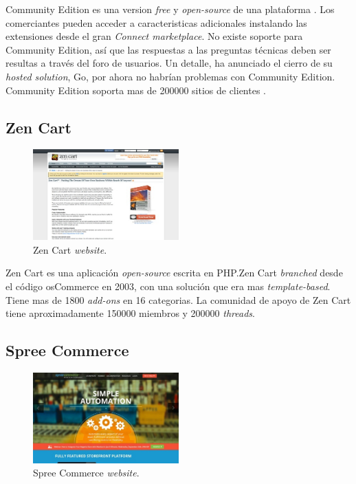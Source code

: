 \nameMagento Community Edition es una version \textit{free} y \textit{open-source} de  una plataforma \ecommerce. Los comerciantes pueden acceder a caracteristicas adicionales instalando las extensiones desde el gran \textit{\nameMagento Connect marketplace}. No existe soporte para \nameMagento Community Edition, así que las respuestas a las preguntas técnicas deben ser resultas a través del foro de usuarios. Un detalle, \nameMagento ha anunciado el cierro de su \textit{hosted solution}, \nameMagento Go, por ahora no habrían problemas con Community Edition. \nameMagento Community Edition soporta mas de 200000 sitios de clientes .

\newcommand{\nameZenCart}{Zen Cart }
\subsection{\nameZenCart}

\begin{figure}[h!]
	\centering
	\includegraphics[width=0.5\textwidth]{figuras/cap1/ZenCartWebsite.jpg}
	\caption{\nameZenCart \textit{website}\cite{online_ZenCart}.}
\end{figure}

\nameZenCart es una aplicación \ecommerce \textit{open-source} escrita en PHP.\nameZenCart \textit{branched} desde el código osCommerce en 2003, con una solución que era mas \textit{template-based}. Tiene mas de 1800 \textit{add-ons} en 16 categorias. La comunidad de apoyo de \nameZenCart tiene aproximadamente 150000 miembros y 200000 \textit{threads}.

\newcommand{\nameSpreeCommerce}{Spree Commerce }
\subsection{\nameSpreeCommerce}

\begin{figure}[h!]
	\centering
	\includegraphics[width=0.5\textwidth]{figuras/cap1/SpreeCommerceWebsite.jpg}
	\caption{\nameSpreeCommerce \textit{website}\cite{online_SpreeCommerce}.}
\end{figure}

